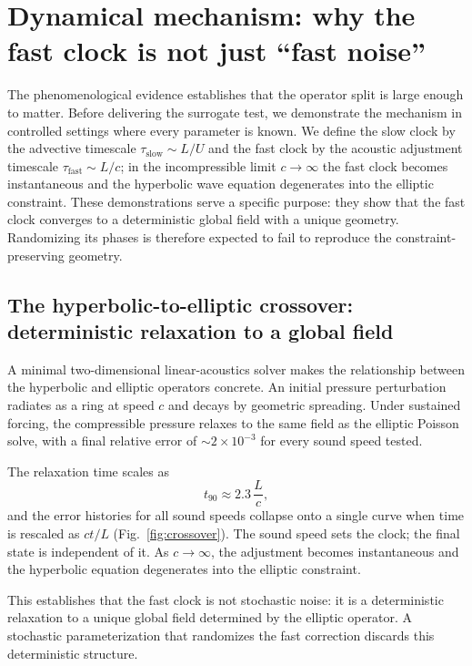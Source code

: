\documentclass[aps,prfluids,preprint,superscriptaddress,nofootinbib]{revtex4-2}
\begin{document}
\section{Dynamical mechanism: why the fast clock is not just ``fast noise''}
\label{sec:mechanism}

The phenomenological evidence establishes that the operator split is large enough to matter. Before delivering the surrogate test, we demonstrate the mechanism in controlled settings where every parameter is known. We define the slow clock by the advective timescale $\tau_{\mathrm{slow}} \sim L/U$ and the fast clock by the acoustic adjustment timescale $\tau_{\mathrm{fast}} \sim L/c$; in the incompressible limit $c \to \infty$ the fast clock becomes instantaneous and the hyperbolic wave equation degenerates into the elliptic constraint. These demonstrations serve a specific purpose: they show that the fast clock converges to a deterministic global field with a unique geometry. Randomizing its phases is therefore expected to fail to reproduce the constraint-preserving geometry.

\subsection{The hyperbolic-to-elliptic crossover: deterministic relaxation to a global field}
\label{sec:crossover}

A minimal two-dimensional linear-acoustics solver makes the relationship between the hyperbolic and elliptic operators concrete. An initial pressure perturbation radiates as a ring at speed $c$ and decays by geometric spreading. Under sustained forcing, the compressible pressure relaxes to the same field as the elliptic Poisson solve, with a final relative error of $\sim 2\times 10^{-3}$ for every sound speed tested.

The relaxation time scales as
\begin{equation}
t_{90} \approx 2.3\,\frac{L}{c},
\label{eq:crossover}
\end{equation}
and the error histories for all sound speeds collapse onto a single curve when time is rescaled as $ct/L$ (Fig.~\ref{fig:crossover}). The sound speed sets the clock; the final state is independent of it. As $c \to \infty$, the adjustment becomes instantaneous and the hyperbolic equation degenerates into the elliptic constraint.

This establishes that the fast clock is not stochastic noise: it is a deterministic relaxation to a unique global field determined by the elliptic operator. A stochastic parameterization that randomizes the fast correction discards this deterministic structure.
\end{document}

